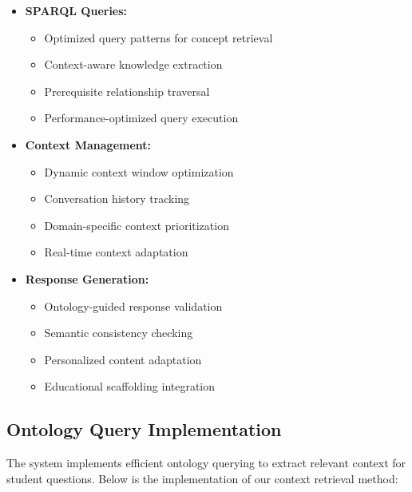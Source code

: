 \begin{itemize}
  \item \textbf{SPARQL Queries:} 
    \begin{itemize}
      \item Optimized query patterns for concept retrieval
      \item Context-aware knowledge extraction
      \item Prerequisite relationship traversal
      \item Performance-optimized query execution
    \end{itemize}
  
  \item \textbf{Context Management:} 
    \begin{itemize}
      \item Dynamic context window optimization
      \item Conversation history tracking
      \item Domain-specific context prioritization
      \item Real-time context adaptation
    \end{itemize}
  
  \item \textbf{Response Generation:} 
    \begin{itemize}
      \item Ontology-guided response validation~\cite{hartl2024knowledge}
      \item Semantic consistency checking
      \item Personalized content adaptation
      \item Educational scaffolding integration
    \end{itemize}
\end{itemize}

\subsection{Ontology Query Implementation}
\label{subsec:ontology-query}

The system implements efficient ontology querying to extract relevant context for student questions. Below is the implementation of our context retrieval method:

